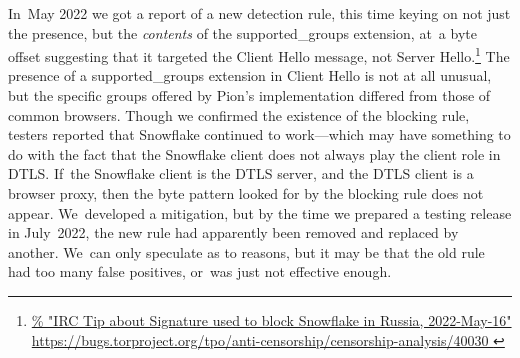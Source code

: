 \documentclass[letterpaper,twocolumn]{article}
\newlength{\urlfootnotesize}
\newcommand{\urlfootnote}[1]{\footnote{
\raggedright\fontsize{\urlfootnotesize}{\urlfootnotesize}\selectfont\url{#1}
}}
\begin{document}
In~May 2022 we got a report of a new detection rule,
this time keying on not just the presence, but the \emph{contents}
of the \mbox{supported\_groups} extension,
at~a byte offset suggesting that
it targeted the Client Hello message,
not Server Hello.\urlfootnote{
https://bugs.torproject.org/tpo/anti-censorship/censorship-analysis/40030
}
The presence of a \mbox{supported\_groups} extension in Client Hello is not at all unusual,
but the specific groups offered by Pion's implementation
differed from those of common browsers.
Though we confirmed the existence of the blocking rule,
testers reported that Snowflake continued to work---which
may have something to do with the fact that the Snowflake client
does not always play the client role in DTLS.
If~the Snowflake client is the DTLS server,
and the DTLS client is a browser proxy,
then the byte pattern looked for by the blocking rule does not appear.
We~developed a mitigation,
but by the time we prepared a testing release in July~2022,
the new rule
had apparently been removed
and replaced by another.
We~can only speculate as to reasons,
but it may be that the old rule
had too many false positives,
or~was just not effective enough.

\end{document}
